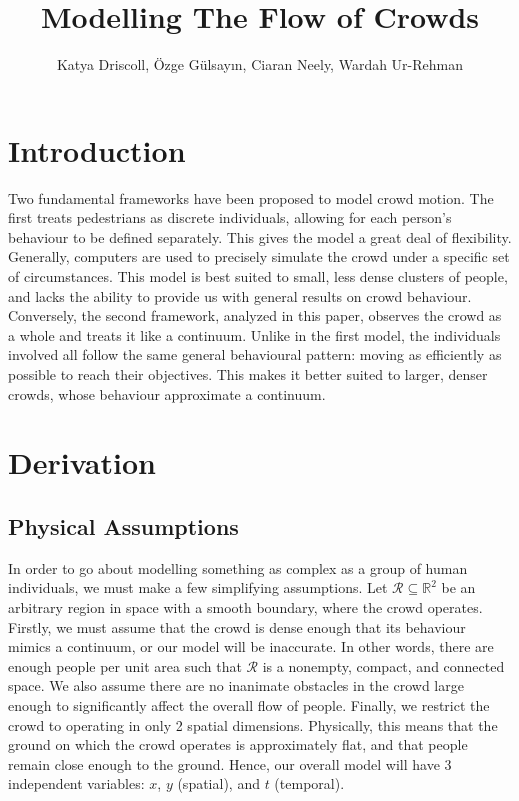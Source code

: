 \documentclass{article}
\title{Modelling The Flow of Crowds}
\author{Katya Driscoll, \"Ozge G\"ulsay{\i}n, Ciaran Neely, Wardah Ur-Rehman}
\begin{document}
\maketitle

\section{Introduction}
Two fundamental frameworks have been proposed to model crowd motion. The first treats pedestrians as discrete individuals, allowing for each person's behaviour to be defined separately. This gives the model a great deal of flexibility. Generally, computers are used to precisely simulate the crowd under a specific set of circumstances. This model is best suited to small, less dense clusters of people, and lacks the ability to provide us with general results on crowd behaviour. Conversely, the second framework, analyzed in this paper, observes the crowd as a whole and treats it like a continuum. Unlike in the first model, the individuals involved all follow the same general behavioural pattern: moving as efficiently as possible to reach their objectives. This makes it better suited to larger, denser crowds, whose behaviour approximate a continuum.

\section{Derivation}
\subsection{Physical Assumptions}
\newcommand\Rpix{\mathcal R_{\text{\texttt{px}}}}
\newcommand{\brydon}{\texttt{Brydon}}
In order to go about modelling something as complex as a group of human individuals, we must make a few simplifying assumptions. Let $\mathcal R\subseteq\mathbb R^2$ be an arbitrary region in space with a smooth boundary, where the crowd operates. Firstly, we must assume that the crowd is dense enough that its behaviour mimics a continuum, or our model will be inaccurate. In other words, there are enough people per unit area such that $\mathcal R$ is a nonempty, compact, and connected space. We also assume there are no inanimate obstacles in the crowd large enough to significantly affect the overall flow of people. Finally, we restrict the crowd to operating in only 2 spatial dimensions. Physically, this means that the ground on which the crowd operates is approximately flat, and that people remain close enough to the ground. Hence, our overall model will have 3 independent variables: $x$, $y$ (spatial), and $t$ (temporal).
\end{document}
